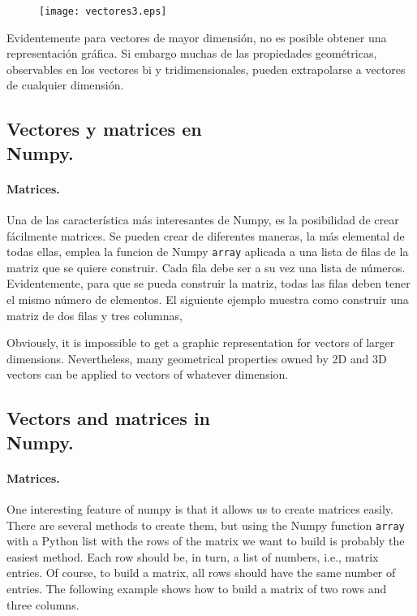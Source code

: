 \begin{figure}[h]
\centering
\texttt{[image: vectores3.eps]}
\label{fig:vectores3}
\end{figure}
\begin{paracol}{2}
Evidentemente para vectores de mayor dimensión, no es posible obtener una representación gráfica. Si embargo muchas de las propiedades geométricas, observables en los vectores bi y tridimensionales, pueden extrapolarse a vectores de cualquier dimensión.

\subsection{Vectores y matrices en\\ Numpy.}   
\paragraph{Matrices.} Una de las característica más interesantes de Numpy, es la posibilidad de crear fácilmente matrices. Se pueden crear de diferentes maneras, la más elemental de todas ellas, emplea la funcion de Numpy \texttt{array} aplicada a una lista de filas de la matriz que se quiere construir. Cada fila debe ser a su vez una lista de números. Evidentemente, para que se pueda construir la matriz, todas las filas deben tener el mismo número de elementos. El siguiente ejemplo muestra como construir una matriz de dos filas y tres columnas,

\switchcolumn 
Obviously, it is impossible to get a graphic representation for vectors of larger dimensions. Nevertheless, many geometrical properties owned by 2D and 3D vectors can be applied to vectors of whatever dimension.

\subsection{Vectors and matrices in \\ Numpy.}
\paragraph{Matrices.} One interesting feature of numpy is that it allows us to create matrices easily. There are several methods to create them, but using the Numpy function \texttt{array} with a Python list with the rows of the matrix we want to build is probably the easiest method. Each row should be, in turn, a list of numbers, i.e., matrix entries. Of course, to build a matrix, all rows should have the same number of entries. The following example shows how to build a matrix of two rows and three columns.
\end{paracol}

